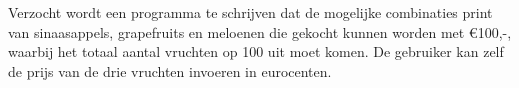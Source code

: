 Verzocht wordt een programma te schrijven dat de mogelijke combinaties print van sinaasappels, grapefruits en meloenen die gekocht kunnen worden met \euro100,-, waarbij het totaal aantal vruchten op 100 uit moet komen. De gebruiker kan zelf de prijs van de drie vruchten invoeren in eurocenten.